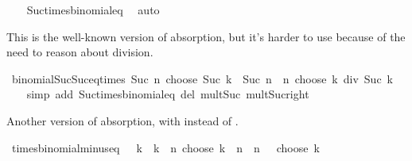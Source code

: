 \begin{isabellebody}
%
\isadelimproof
\ \ %
\endisadelimproof
%
\isatagproof
{}\isamarkupfalse%
\ Suc{\isacharunderscore}{\kern0pt}times{\isacharunderscore}{\kern0pt}binomial{\isacharunderscore}{\kern0pt}eq\ \isamarkupfalse%
\ auto%
\endisatagproof
{\isafoldproof}%
%
\isadelimproof
%
\endisadelimproof
%
\begin{isamarkuptext}%
This is the well-known version of absorption, but it's harder to use
  because of the need to reason about division.%
\end{isamarkuptext}\isamarkuptrue%
\isamarkupfalse%
\ binomial{\isacharunderscore}{\kern0pt}Suc{\isacharunderscore}{\kern0pt}Suc{\isacharunderscore}{\kern0pt}eq{\isacharunderscore}{\kern0pt}times{\isacharcolon}{\kern0pt}\ {\isachardoublequoteopen}{\isacharparenleft}{\kern0pt}Suc\ n\ choose\ Suc\ k{\isacharparenright}{\kern0pt}\ {\isacharequal}{\kern0pt}\ {\isacharparenleft}{\kern0pt}Suc\ n\ {\isacharasterisk}{\kern0pt}\ {\isacharparenleft}{\kern0pt}n\ choose\ k{\isacharparenright}{\kern0pt}{\isacharparenright}{\kern0pt}\ div\ Suc\ k{\isachardoublequoteclose}\isanewline
%
\isadelimproof
\ \ %
\endisadelimproof
%
\isatagproof
{}\isamarkupfalse%
\ {\isacharparenleft}{\kern0pt}simp\ add{\isacharcolon}{\kern0pt}\ Suc{\isacharunderscore}{\kern0pt}times{\isacharunderscore}{\kern0pt}binomial{\isacharunderscore}{\kern0pt}eq\ del{\isacharcolon}{\kern0pt}\ mult{\isacharunderscore}{\kern0pt}Suc\ mult{\isacharunderscore}{\kern0pt}Suc{\isacharunderscore}{\kern0pt}right{\isacharparenright}{\kern0pt}%
\endisatagproof
{\isafoldproof}%
%
\isadelimproof
%
\endisadelimproof
%
\begin{isamarkuptext}%
Another version of absorption, with  instead of .%
\end{isamarkuptext}\isamarkuptrue%
\isamarkupfalse%
\ times{\isacharunderscore}{\kern0pt}binomial{\isacharunderscore}{\kern0pt}minus{}{\isacharunderscore}{\kern0pt}eq{\isacharcolon}{\kern0pt}\ {\isachardoublequoteopen}{}\ {\isacharless}{\kern0pt}\ k\ {\isasymLongrightarrow}\ k\ {\isacharasterisk}{\kern0pt}\ {\isacharparenleft}{\kern0pt}n\ choose\ k{\isacharparenright}{\kern0pt}\ {\isacharequal}{\kern0pt}\ n\ {\isacharasterisk}{\kern0pt}\ {\isacharparenleft}{\kern0pt}{\isacharparenleft}{\kern0pt}n\ {\isacharminus}{\kern0pt}\ {}{\isacharparenright}{\kern0pt}\ choose\ {\isacharparenleft}{\kern0pt}k\ {\isacharminus}{\kern0pt}\ {}{\isacharparenright}{\kern0pt}{\isacharparenright}{\kern0pt}{\isachardoublequoteclose}\isanewline

\end{isabellebody}
